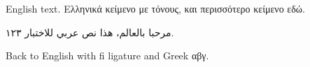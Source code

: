 \documentclass{article}
\begin{document}
English text. \textgreek{Ελληνικά κείμενο με τόνους, και περισσότερο κείμενο εδώ.}

\begin{Arabic}
مرحبا بالعالم، هذا نص عربي للاختبار ١٢٣.
\end{Arabic}

Back to English with fi ligature and Greek \textgreek{αβγ}.
\end{document}
